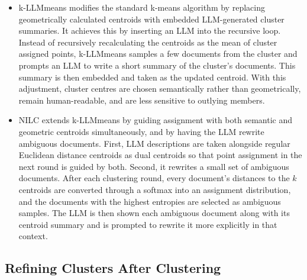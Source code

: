 \documentclass[11pt,a4paper,oneside]{report}
\begin{document}
\begin{itemize}
\item k-LLMmeans \citep{diazrodriguez2026kllmmeans} modifies the standard k-means algorithm by replacing geometrically calculated centroids with embedded LLM-generated cluster summaries. It achieves this by inserting an LLM into the recursive loop. Instead of recursively recalculating the centroids as the mean of cluster assigned points, k-LLMmeans samples a few documents from the cluster and prompts an LLM to write a short summary of the cluster's documents. This summary is then embedded and taken as the updated centroid. With this adjustment, cluster centres are chosen semantically rather than geometrically, remain human-readable, and are less sensitive to outlying members.
\item NILC extends k-LLMmeans by guiding assignment with both semantic and geometric centroids simultaneously, and by having the LLM rewrite ambiguous documents. First, LLM descriptions are taken alongside regular Euclidean distance centroids as dual centroids so that point assignment in the next round is guided by both. Second, it rewrites a small set of ambiguous documents. After each clustering round, every document's distances to the $k$ centroids are converted through a softmax into an assignment distribution, and the documents with the highest entropies are selected as ambiguous samples. The LLM is then shown each ambiguous document along with its centroid summary and is prompted to rewrite it more explicitly in that context.
\end{itemize}

\subsection{Refining Clusters After Clustering}\label{sec:after}
\end{document}

